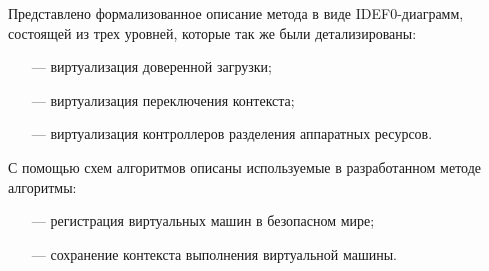 Представлено формализованное описание метода в виде IDEF0-диаграмм, состоящей из трех уровней, которые так же были детализированы:

\begin{itemize}
	\item [---] виртуализация доверенной загрузки;
	\item [---] виртуализация переключения контекста;
	\item [---] виртуализация контроллеров разделения аппаратных ресурсов.
\end{itemize}

С помощью схем алгоритмов описаны используемые в разработанном методе алгоритмы:

\begin{itemize}
	\item [---] регистрация виртуальных машин в безопасном мире;
	\item [---] сохранение контекста выполнения виртуальной машины.
\end{itemize}

\pagebreak
